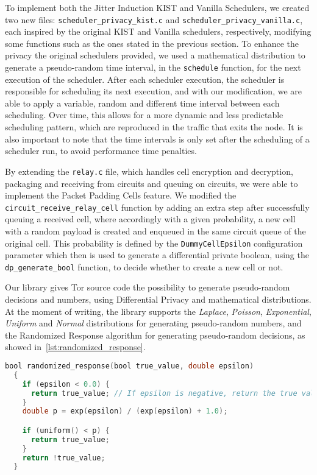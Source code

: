 To implement both the Jitter Induction KIST and Vanilla Schedulers, we created two new files: \texttt{scheduler\_privacy\_kist.c} and \texttt{scheduler\_privacy\_vanilla.c}, each inspired by the original KIST and Vanilla schedulers, respectively, modifying some functions such as the ones stated in the previous section. 
To enhance the privacy the original schedulers provided, we used a mathematical distribution to generate a pseudo-random time interval, in the \texttt{schedule} function, for the next execution of the scheduler. After each scheduler execution, the scheduler is responsible for scheduling its next execution, and with our modification, we are able to apply a variable, random and different time interval between each scheduling. Over time, this allows for a more dynamic and less predictable scheduling pattern, which are reproduced in the traffic that exits the node.
It is also important to note that the time intervals is only set after the scheduling of a scheduler run, to avoid performance time penalties.

By extending the \texttt{relay.c} file, which handles cell encryption and decryption, packaging and receiving from circuits and queuing on circuits, we were able to implement the Packet Padding Cells feature. We modified the \texttt{circuit\_receive\_relay\_cell} function by adding an extra step after successfully queuing a received cell, where accordingly with a given probability, a new cell with a random payload is created and enqueued in the same circuit queue of the original cell. This probability is defined by the \texttt{DummyCellEpsilon} configuration parameter which then is used to generate a differential private boolean, using the \texttt{dp\_generate\_bool} function, to decide whether to create a new cell or not.  

Our library gives Tor source code the possibility to  generate pseudo-random decisions and numbers, using Differential Privacy and mathematical distributions. At the moment of writing, the library supports the \textit{Laplace}, \textit{Poisson}, \textit{Exponential}, \textit{Uniform} and \textit{Normal} distributions for generating pseudo-random numbers, and the Randomized Response algorithm for generating pseudo-random decisions, as showed in~\autoref{lst:randomized_response}.
\begin{lstlisting}[language=C, caption={Randomized Response algorithm implementation.}, label={lst:randomized_response}]
  bool randomized_response(bool true_value, double epsilon)
  {
    if (epsilon < 0.0) {
      return true_value; // If epsilon is negative, return the true value
    }
    double p = exp(epsilon) / (exp(epsilon) + 1.0);

    if (uniform() < p) {
      return true_value;
    }
    return !true_value;
  }
\end{lstlisting}

